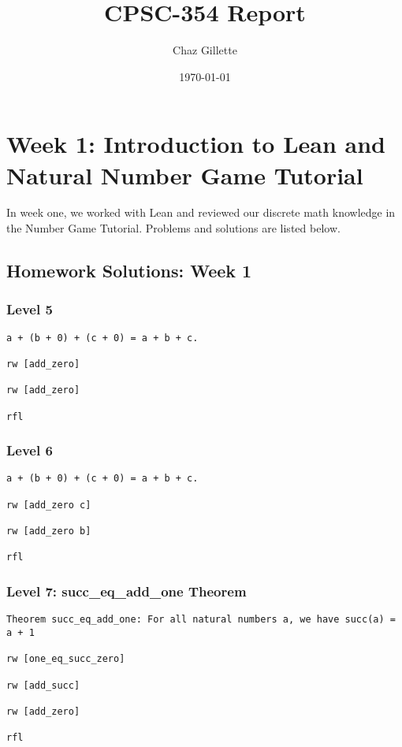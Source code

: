 \documentclass{article}
\title{CPSC-354 Report}
\author{Chaz Gillette}
\date{\today}
\begin{document}
\maketitle
\tableofcontents
\newpage

\section{Week 1: Introduction to Lean and Natural Number Game Tutorial}
\label{sec:week1}

In week one, we worked with Lean and reviewed our discrete math knowledge in the Number Game Tutorial. Problems and solutions are listed below.

\subsection*{Homework Solutions: Week 1}

\subsubsection*{Level 5}
\begin{lstlisting}[style=leanstyle]
a + (b + 0) + (c + 0) = a + b + c.

rw [add_zero]

rw [add_zero]

rfl
\end{lstlisting}

\subsubsection*{Level 6}
\begin{lstlisting}[style=leanstyle]
a + (b + 0) + (c + 0) = a + b + c.

rw [add_zero c]

rw [add_zero b]

rfl
\end{lstlisting}

\subsubsection*{Level 7: succ\_eq\_add\_one Theorem}
\begin{lstlisting}[style=leanstyle]
Theorem succ_eq_add_one: For all natural numbers a, we have succ(a) = a + 1

rw [one_eq_succ_zero]

rw [add_succ]

rw [add_zero]

rfl
\end{lstlisting}
\end{document}
